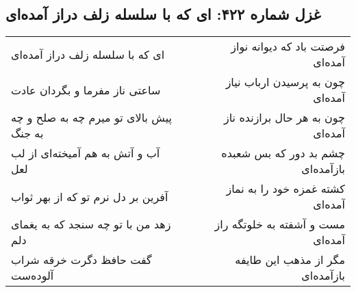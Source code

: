 \begin{center}
\section*{غزل شماره ۴۲۲: ای که با سلسله زلف دراز آمده‌ای}
\label{sec:sh422}
\begin{longtable}{l p{0.5cm} r}
ای که با سلسله زلف دراز آمده‌ای
&&
فرصتت باد که دیوانه نواز آمده‌ای
\\
ساعتی ناز مفرما و بگردان عادت
&&
چون به پرسیدن ارباب نیاز آمده‌ای
\\
پیش بالای تو میرم چه به صلح و چه به جنگ
&&
چون به هر حال برازنده ناز آمده‌ای
\\
آب و آتش به هم آمیخته‌ای از لب لعل
&&
چشم بد دور که بس شعبده بازآمده‌ای
\\
آفرین بر دل نرم تو که از بهر ثواب
&&
کشته غمزه خود را به نماز آمده‌ای
\\
زهد من با تو چه سنجد که به یغمای دلم
&&
مست و آشفته به خلوتگه راز آمده‌ای
\\
گفت حافظ دگرت خرقه شراب آلوده‌ست
&&
مگر از مذهب این طایفه بازآمده‌ای
\\
\end{longtable}
\end{center}
